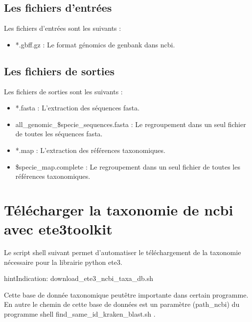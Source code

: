 \documentclass[letterpaper,10pt,french]{sphinxmanual}
\begin{document}
\subsection{Les fichiers d’entrées}
\label{\detokenize{download/download_refseq_species_sequences.sh:les-fichiers-d-entrees}}
Les fichiers d’entrées sont les suivants :
\begin{itemize}
\item {} 
*.gbff.gz : Le format génomics de genbank dans ncbi.

\end{itemize}


\subsection{Les fichiers de sorties}
\label{\detokenize{download/download_refseq_species_sequences.sh:les-fichiers-de-sorties}}
Les fichiers de sorties sont les suivants :
\begin{itemize}
\item {} 
*.fasta : L’extraction des séquences fasta.

\item {} 
all\_genomic\_\$specie\_sequences.fasta : Le regroupement dans un seul fichier de toutes les séquences fasta.

\item {} 
*.map : L’extraction des références taxonomiques.

\item {} 
\$specie\_map.complete : Le regroupement dans un seul fichier de toutes les références taxonomiques.

\end{itemize}


\section{Télécharger la taxonomie de ncbi avec ete3toolkit}
\label{\detokenize{download/download_ete3_ncbi_taxonomy_database.sh:telecharger-la-taxonomie-de-ncbi-avec-ete3toolkit}}\label{\detokenize{download/download_ete3_ncbi_taxonomy_database.sh::doc}}
Le script shell suivant permet d’automatiser le téléchargement de la taxonomie nécessaire pour la librairie python ete3.

\begin{sphinxadmonition}{hint}{Indication:}
download\_ete3\_ncbi\_taxa\_db.sh
\end{sphinxadmonition}

Cette base de donnée taxonomique peut\sphinxhyphen{}être importante dans certain programme. En autre le chemin de cette base de données est un paramètre (\sphinxhyphen{}path\_ncbi) du programme shell find\_same\_id\_kraken\_blast.sh .
\end{document}
